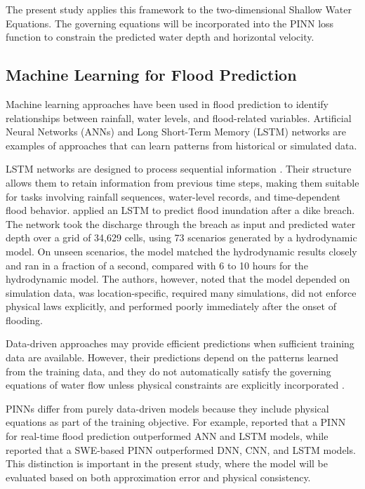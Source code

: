 The present study applies this framework to the two-dimensional Shallow Water Equations. The governing equations will be incorporated into the PINN loss function to constrain the predicted water depth and horizontal velocity.

\subsection{Machine Learning for Flood Prediction}

Machine learning approaches have been used in flood prediction to identify relationships between rainfall, water levels, and flood-related variables. Artificial Neural Networks (ANNs) and Long Short-Term Memory (LSTM) networks are examples of approaches that can learn patterns from historical or simulated data.

LSTM networks are designed to process sequential information \cite{lstmreview2020}. Their structure allows them to retain information from previous time steps, making them suitable for tasks involving rainfall sequences, water-level records, and time-dependent flood behavior.  applied an LSTM to predict flood inundation after a dike breach. The network took the discharge through the breach as input and predicted water depth over a grid of 34,629 cells, using 73 scenarios generated by a hydrodynamic model. On unseen scenarios, the model matched the hydrodynamic results closely and ran in a fraction of a second, compared with 6 to 10 hours for the hydrodynamic model. The authors, however, noted that the model depended on simulation data, was location-specific, required many simulations, did not enforce physical laws explicitly, and performed poorly immediately after the onset of flooding.

Data-driven approaches may provide efficient predictions when sufficient training data are available. However, their predictions depend on the patterns learned from the training data, and they do not automatically satisfy the governing equations of water flow unless physical constraints are explicitly incorporated \cite{liu2026,hybridreview2026}.

PINNs differ from purely data-driven models because they include physical equations as part of the training objective. For example,  reported that a PINN for real-time flood prediction outperformed ANN and LSTM models, while  reported that a SWE-based PINN outperformed DNN, CNN, and LSTM models. This distinction is important in the present study, where the model will be evaluated based on both approximation error and physical consistency.

